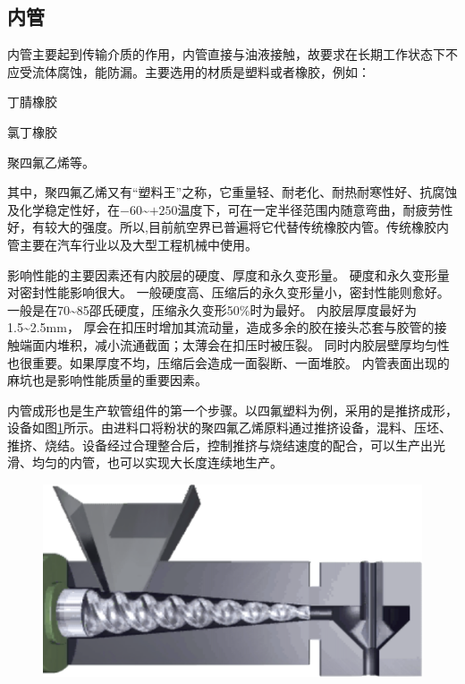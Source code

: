 \subsection{内管}


内管主要起到传输介质的作用，内管直接与油液接触，故要求在长期工作状态下不应受流体腐蚀，能防漏。主要选用的材质是塑料或者橡胶，例如：
\begin{inparaenum}
	\item 
	丁腈橡胶
	\item 
	氯丁橡胶
	\item 
	聚四氟乙烯等。
\end{inparaenum}		
其中，聚四氟乙烯又有“塑料王”之称，它重量轻、耐老化、耐热耐寒性好、抗腐蚀及化学稳定性好，在$ - 60 $\textcelsius \textasciitilde $ +250 $\textcelsius 温度下，可在一定半径范围内随意弯曲，耐疲劳性好，有较大的强度。所以,目前航空界已普遍将它代替传统橡胶内管。传统橡胶内管主要在汽车行业以及大型工程机械中使用。
	
影响性能的主要因素还有内胶层的硬度、厚度和永久变形量。
硬度和永久变形量对密封性能影响很大。
一般硬度高、压缩后的永久变形量小，密封性能则愈好。
一般是在70\textasciitilde 85邵氏硬度，压缩永久变形50\%时为最好。
内胶层厚度最好为1.5\textasciitilde 2.5mm，
厚会在扣压时增加其流动量，造成多余的胶在接头芯套与胶管的接触端面内堆积，减小流通截面；太薄会在扣压时被压裂。
同时内胶层壁厚均匀性也很重要。如果厚度不均，压缩后会造成一面裂断、一面堆胶。
内管表面出现的麻坑也是影响性能质量的重要因素。
	
	
内管成形也是生产软管组件的第一个步骤。以四氟塑料为例，采用的是推挤成形，设备如图\ref{fig:inner-tube-produce}所示。由进料口将粉状的聚四氟乙烯原料通过推挤设备，混料、压坯、推挤、烧结。设备经过合理整合后，控制推挤与烧结速度的配合，可以生产出光滑、均匀的内管，也可以实现大长度连续地生产。











\begin{figure}[!htbp]
	\centering
	\includegraphics[width=0.4\linewidth]{figure/chap3/Hose/innertube-product}
	\label{fig:inner-tube-produce}
\end{figure}




